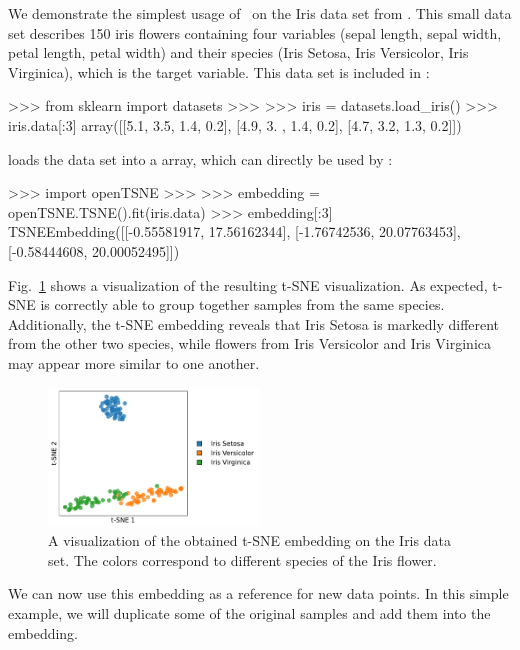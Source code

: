\documentclass[article]{jss}
\newcommand{\opentsne}{\pkg{openTSNE}}
\begin{document}
We demonstrate the simplest usage of \opentsne\ on the Iris data set from \citet{anderson1936species}. This small data set describes 150 iris flowers containing four variables (sepal length, sepal width, petal length, petal width) and their species (Iris Setosa, Iris Versicolor, Iris Virginica), which is the target variable. This data set is included in :
\begin{CodeChunk}
\begin{CodeInput}
>>> from sklearn import datasets
>>>
>>> iris = datasets.load_iris()
>>> iris.data[:3]
array([[5.1, 3.5, 1.4, 0.2],
       [4.9, 3. , 1.4, 0.2],
       [4.7, 3.2, 1.3, 0.2]])
\end{CodeInput}
\end{CodeChunk}
 loads the data set into a  array, which can directly
be used by \opentsne:
\begin{CodeChunk}
\begin{CodeInput}
>>> import openTSNE
>>>
>>> embedding = openTSNE.TSNE().fit(iris.data)
>>> embedding[:3]
TSNEEmbedding([[-0.55581917, 17.56162344],
               [-1.76742536, 20.07763453],
               [-0.58444608, 20.00052495]])
\end{CodeInput}
\end{CodeChunk}
Fig.~\ref{fig:iris} shows a visualization of the resulting t-SNE visualization. As expected, t-SNE is correctly able to group together samples from the same species. Additionally, the t-SNE embedding reveals that Iris Setosa is markedly different from the other two species, while flowers from Iris Versicolor and Iris Virginica may appear more similar to one another.
\begin{figure}[htbp]
  \centering
  \includegraphics[width=0.5\textwidth]{iris}
  \caption{\label{fig:iris}
  A visualization of the obtained t-SNE embedding on the Iris data set. The colors
  correspond to different species of the Iris flower.
}
\end{figure}
We can now use this embedding as a reference for new data points. In this simple example, we will duplicate some of the original samples and add them into the embedding.
\end{document}
